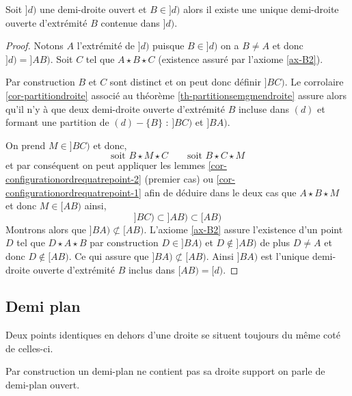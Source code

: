 \begin{cor}\label{cor-demidroitedansdemidroite}
    Soit $]d)$ une demi-droite ouvert et $B\in]d)$ alors il existe une unique demi-droite ouverte d'extrémité $B$ contenue dans $]d)$.
\begin{proof}
    Notons $A$ l'extrémité de $]d)$ puisque $B\in]d)$ on a $B\neq A$ et donc $]d)=]AB)$. Soit $C$ tel que $A\star B \star C$ (existence assuré par l'axiome \ref{ax-B2}). 
    
    Par construction $B$ et $C$ sont distinct et on peut donc définir $]BC)$. Le corrolaire \ref{cor-partitiondroite} associé au théorème \ref{th-partitionsemgmendroite} assure alors qu'il n'y à que deux demi-droite ouverte d'extrémité $B$ incluse dans $(d)$ et formant une partition de $(d)-\{B\}$ : $]BC)$ et $]BA)$.
    
    On prend $M\in ]BC)$ et donc,
    \begin{equation*}
        \text{soit } B\star M\star C \qquad \text{soit } B\star C\star M
    \end{equation*}
    et par conséquent on peut appliquer les lemmes \ref{cor-configurationordrequatrepoint-2} (premier cas) ou \ref{cor-configurationordrequatrepoint-1} afin de déduire dans le deux cas que $A\star B\star M$ et donc $M\in [AB)$ ainsi, 
    \begin{equation*}
        ]BC)\subset]AB)\subset[AB)
    \end{equation*}
    Montrons alors que $]BA)\not\subset [AB)$. L'axiome \ref{ax-B2} assure l'existence d'un point $D$ tel que $D \star A \star B$ par construction $D\in ]BA)$ et $D\notin ]AB)$ de plus $D\neq A$ et donc $D\notin [AB)$. Ce qui assure que $]BA)\not\subset [AB)$. Ainsi $]BA)$ est l'unique demi-droite ouverte d'extrémité $B$ inclus dans $[AB)=[d)$.
\end{proof}
\end{cor}
        
        \subsection{Demi plan}

\begin{rema}
Deux points identiques en dehors d'une droite se situent toujours du même coté de celles-ci. 
\end{rema}

\begin{rema}
Par construction un demi-plan ne contient pas sa droite support on parle de demi-plan ouvert.
\end{rema}

